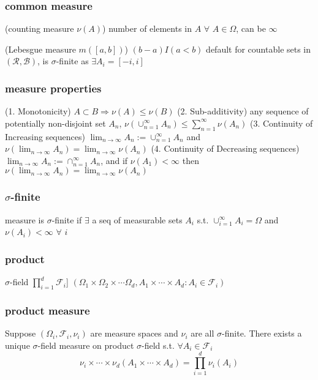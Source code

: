\subsubsection{common measure}
(counting measure $\nu(A)$) number of elements in $A$ $\forall$ $A \in \Omega$, can be $\infty$

(Lebesgue measure $m([a, b])$) $(b-a) I(a < b)$ default for countable sets in $(\mathcal{R}, \mathcal{B})$, is $\sigma$-finite as $\exists A_i=[-i, i]$

\subsubsection{measure properties}
(1. Monotonicity) $A\subset B \Rightarrow \nu(A) \leq \nu(B)$
\newline(2. Sub-additivity) any sequence of potentially non-disjoint set $A_n$, $\nu(\cup_{n=1}^\infty A_n) \leq \sum_{n=1}^\infty \nu(A_n)$
\newline(3. Continuity of Increasing sequences) $\lim_{n\rightarrow\infty} A_n := \cup_{n=1}^\infty A_n$ and $\nu(\lim_{n\rightarrow \infty} A_n) = \lim_{n\rightarrow \infty} \nu(A_n)$
\newline(4. Continuity of Decreasing sequences) $\lim_{n\rightarrow \infty} A_n := \cap_{n=1}^\infty A_n$, and if $\nu(A_1) < \infty$ then $\nu(\lim_{n\rightarrow \infty} A_n) = \lim_{n\rightarrow \infty} \nu(A_n)$

\subsubsection{$\sigma$-finite}
measure is $\sigma$-finite if $\exists$ a seq of measurable sets $A_i$ s.t. $\cup_{i=1}^\infty A_i = \Omega$ and $\nu(A_i)<\infty$  $\forall$ $i$

\subsubsection{product}
$\sigma$-field $\prod_{i=1}^d \mathcal{F}_i$] $(\Omega_1\times \Omega_2 \times \cdots \Omega_d, A_1\times \cdots \times A_d: A_i \in \mathcal{F}_i)$

\subsubsection{product measure} Suppose $(\Omega_i, \mathcal{F}_i, \nu_i)$ are measure spaces and $\nu_i$ are all $\sigma$-finite. There exists a unique $\sigma$-field measure on product $\sigma$-field s.t. $\forall A_i\in\mathcal{F}_i$
$$
\nu_i\times\cdots\times\nu_d(A_1\times\cdots\times A_d) = \prod_{i=1}^d\nu_i(A_i)
$$

